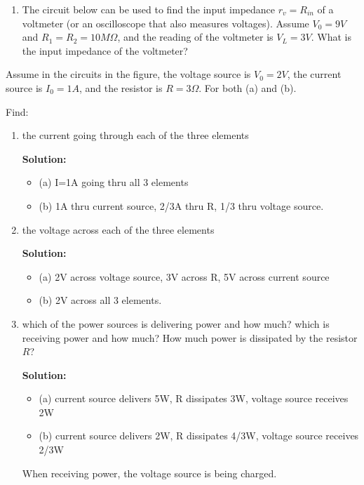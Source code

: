 \begin{enumerate}

\item The circuit below can be used to find the input impedance $r_v=R_{in}$ of 
  a voltmeter (or an oscilloscope that also measures voltages). Assume $V_0=9V$
  and $R_1=R_2=10 M\Omega$, and the reading of the voltmeter is $V_L=3V$. 
  What is the input impedance of the voltmeter?
  




\end{enumerate}



\item Assume in the circuits in the figure, the voltage source is $V_0=2V$,
	the current source is $I_0=1A$, and the resistor is $R=3\Omega$.
	For both (a) and (b).


Find:
\begin{enumerate}
\item the current going through each of the three elements

{\bf Solution:}
\begin{itemize}
\item (a) I=1A going thru all 3 elements 
\item (b) 1A thru current source, 2/3A thru R, 1/3 thru voltage source.
\end{itemize}

\item the voltage across each of the three elements

{\bf Solution:}
\begin{itemize}
\item (a) 2V across voltage source, 3V across R, 5V across current source
\item (b) 2V across all 3 elements.
\end{itemize}

\item which of the power sources is delivering power and how much? which is 
	receiving power and how much? How much power is dissipated by the
	resistor $R$?

{\bf Solution:}
\begin{itemize}
\item (a) current source delivers 5W, R dissipates 3W, voltage source 
	receives 2W
\item (b) current source delivers 2W, R dissipates 4/3W, voltage source 
	receives 2/3W 
\end{itemize}
When receiving power, the voltage source is being charged.
\end{enumerate}

